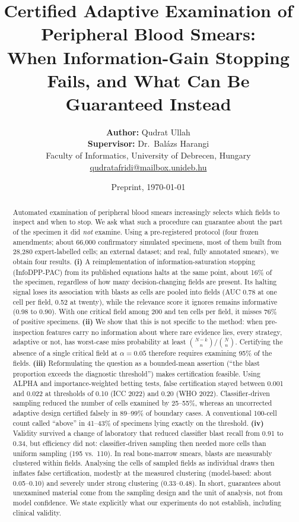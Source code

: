 \documentclass[11pt]{article}
\title{Certified Adaptive Examination of Peripheral Blood Smears:\\
When Information-Gain Stopping Fails, and What Can Be Guaranteed Instead}
\author{%
\begin{tabular}{c}
\textbf{Author:} Qudrat Ullah\\
\textbf{Supervisor:} Dr.\ Bal\'azs Harangi\\[4pt]
\normalsize Faculty of Informatics, University of Debrecen, Hungary\\
\normalsize \href{mailto:qudratafridi@mailbox.unideb.hu}{qudratafridi@mailbox.unideb.hu}
\end{tabular}}
\date{Preprint, \today}
\theoremstyle{remark}
\theoremstyle{definition}
\begin{document}
\maketitle

\begin{abstract}
Automated examination of peripheral blood smears increasingly selects which fields to inspect and when to stop. We ask what such a procedure can guarantee about the part of the specimen it did \emph{not} examine. Using a pre-registered protocol (four frozen amendments; about 66,000 confirmatory simulated specimens, most of them built from 28,280 expert-labelled cells; an external dataset; and real, fully annotated smears), we obtain four results.
\textbf{(i)} A reimplementation of information-saturation stopping (InfoDPP-PAC) from its published equations halts at the same point, about 16\% of the specimen, regardless of how many decision-changing fields are present. Its halting signal loses its association with blasts as cells are pooled into fields (AUC 0.78 at one cell per field, 0.52 at twenty), while the relevance score it ignores remains informative (0.98 to 0.90). With one critical field among 200 and ten cells per field, it misses 76\% of positive specimens.
\textbf{(ii)} We show that this is not specific to the method: when pre-inspection features carry no information about where rare evidence lies, every strategy, adaptive or not, has worst-case miss probability at least $\binom{N-k}{n}/\binom{N}{n}$. Certifying the absence of a single critical field at $\alpha=0.05$ therefore requires examining 95\% of the fields.
\textbf{(iii)} Reformulating the question as a bounded-mean assertion (``the blast proportion exceeds the diagnostic threshold'') makes certification feasible. Using ALPHA and importance-weighted betting tests, false certification stayed between 0.001 and 0.022 at thresholds of 0.10 (ICC 2022) and 0.20 (WHO 2022). Classifier-driven sampling reduced the number of cells examined by 25--55\%, whereas an uncorrected adaptive design certified falsely in 89--99\% of boundary cases. A conventional 100-cell count called ``above'' in 41--43\% of specimens lying exactly on the threshold.
\textbf{(iv)} Validity survived a change of laboratory that reduced classifier blast recall from 0.91 to 0.34, but efficiency did not: classifier-driven sampling then needed more cells than uniform sampling (195 vs.\ 110). In real bone-marrow smears, blasts are measurably clustered within fields. Analysing the cells of sampled fields as individual draws then inflates false certification, modestly at the measured clustering (model-based: about 0.05--0.10) and severely under strong clustering (0.33--0.48). In short, guarantees about unexamined material come from the sampling design and the unit of analysis, not from model confidence. We state explicitly what our experiments do not establish, including clinical validity.
\end{abstract}
\end{document}
